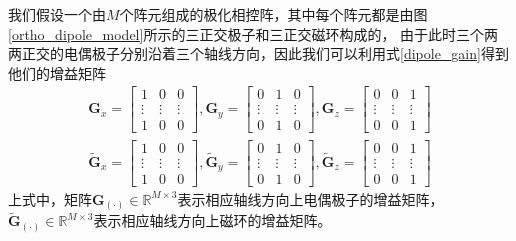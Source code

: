 \documentclass[master]{thesis-uestc}
\begin{document}
我们假设一个由$M$个阵元组成的极化相控阵，其中每个阵元都是由图\ref{ortho_dipole_model}所示的三正交极子和三正交磁环构成的，
由于此时三个两两正交的电偶极子分别沿着三个轴线方向，因此我们可以利用式\eqref{dipole_gain}得到他们的增益矩阵
\begin{subequations}
    \begin{align}
        \bm{G}_x = 
        \begin{bmatrix}
            1 & 0 & 0 \\
            \vdots & \vdots & \vdots \\
            1 & 0 & 0
        \end{bmatrix},
        \bm{G}_y = 
        \begin{bmatrix}
            0 & 1 & 0 \\
            \vdots & \vdots & \vdots \\
            0 & 1 & 0
        \end{bmatrix},
        \bm{G}_z = 
        \begin{bmatrix}
            0 & 0 & 1 \\
            \vdots & \vdots & \vdots \\
            0 & 0 & 1
        \end{bmatrix} \\
        \tilde{\bm{G}}_x = 
        \begin{bmatrix}
            1 & 0 & 0 \\
            \vdots & \vdots & \vdots \\
            1 & 0 & 0
        \end{bmatrix},
        \tilde{\bm{G}}_y = 
        \begin{bmatrix}
            0 & 1 & 0 \\
            \vdots & \vdots & \vdots \\
            0 & 1 & 0
        \end{bmatrix},
        \tilde{\bm{G}}_z = 
        \begin{bmatrix}
            0 & 0 & 1 \\
            \vdots & \vdots & \vdots \\
            0 & 0 & 1
        \end{bmatrix}
    \end{align}
\end{subequations}
上式中，矩阵$\bm{G}_{(\cdot)}\in\mathbb{R}^{M\times3}$表示相应轴线方向上电偶极子的增益矩阵，
$\tilde{\bm{G}}_{(\cdot)}\in\mathbb{R}^{M\times3}$表示相应轴线方向上磁环的增益矩阵。
\end{document}
